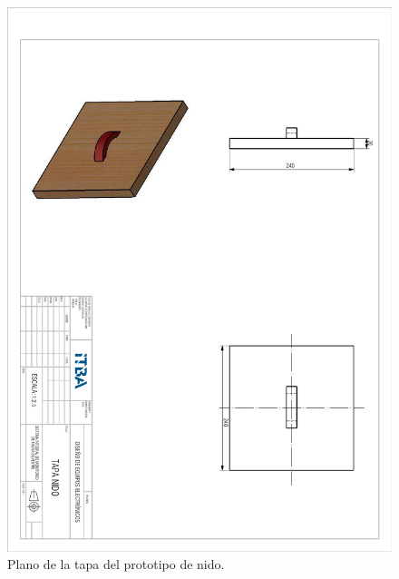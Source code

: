 \begin{figure}[H]
	\centering
	\includegraphics[width=\linewidth]{ImagenesApendice/tapa_nido_plano}
	\caption{Plano de la tapa del prototipo de nido.}
	\label{fig:tapa_nido_plano}
\end{figure}

